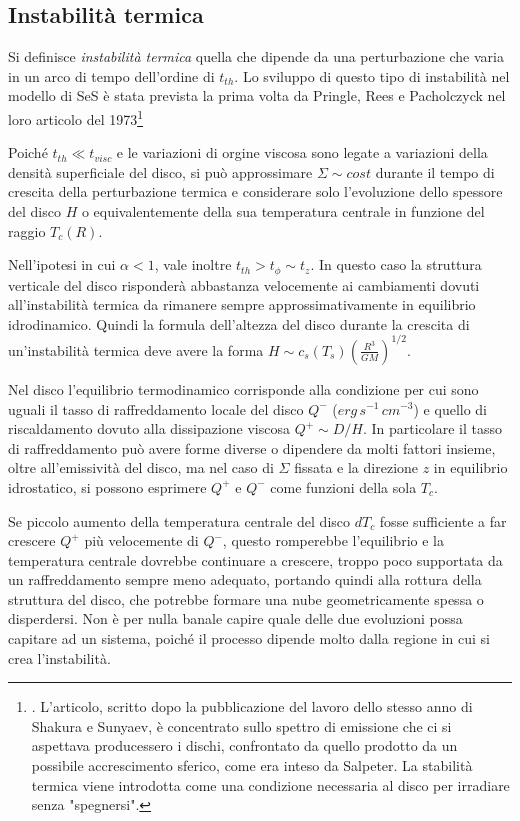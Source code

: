 \documentclass[a4paperbi]{article}
\begin{document}
\subsection{Instabilità termica}
	Si definisce \textit{instabilità termica} quella che dipende da una perturbazione che varia in un arco di tempo dell'ordine di $t_{th}$. Lo sviluppo di questo tipo di instabilità nel modello di SeS è stata prevista la prima volta da Pringle, Rees e Pacholczyck nel loro articolo del 1973\footnote{\cite{PringleReesPacholczyk1973}. L'articolo, scritto dopo la pubblicazione del lavoro dello stesso anno di Shakura e Sunyaev, è concentrato sullo spettro di emissione che ci si aspettava producessero i dischi, confrontato da quello prodotto da un possibile accrescimento sferico, come era inteso da Salpeter. La stabilità termica viene introdotta come una condizione necessaria al disco per irradiare senza "spegnersi".}

	Poiché $t_{th}\ll t_{visc}$ e le variazioni di orgine viscosa sono legate a variazioni della densità superficiale del disco, si può approssimare $\Sigma\sim cost$ durante il tempo di crescita della perturbazione termica e considerare solo l'evoluzione dello spessore del disco $H$ o equivalentemente della sua temperatura centrale in funzione del raggio $T_c(R)$.
	
	Nell'ipotesi in cui $\alpha<1$, vale inoltre $t_{th}>t_\phi\sim t_z$. In questo caso la struttura verticale del disco risponderà abbastanza velocemente ai cambiamenti dovuti all'instabilità termica da rimanere sempre approssimativamente in equilibrio idrodinamico. Quindi la formula dell'altezza del disco durante la crescita di un'instabilità termica deve avere la forma $H\sim c_s(T_s)\left(\frac{R^3}{GM}\right)^{1/2}$.
	
	Nel disco l'equilibrio termodinamico corrisponde alla condizione per cui sono uguali il tasso di raffreddamento locale del disco $Q^-$ ($erg\,s^{-1}\,cm^{-3}$) e quello di riscaldamento dovuto alla dissipazione viscosa $Q^+\sim D/H$. In particolare il tasso di raffreddamento può avere forme diverse o dipendere da molti fattori insieme, oltre all'emissività del disco, ma nel caso di $\Sigma$ fissata e la direzione $z$ in equilibrio idrostatico, si possono esprimere $Q^+$ e $Q^-$ come funzioni della sola $T_c$. 
	
	Se piccolo aumento della temperatura centrale del disco $dT_c$ fosse sufficiente a far crescere $Q^+$ più velocemente di $Q^-$, questo romperebbe l'equilibrio e la temperatura centrale dovrebbe continuare a crescere, troppo poco supportata da un raffreddamento sempre meno adequato, portando quindi alla rottura della struttura del disco, che potrebbe formare una nube geometricamente spessa o disperdersi. Non è per nulla banale capire quale delle due evoluzioni possa capitare ad un sistema, poiché il processo dipende molto dalla regione in cui si crea l'instabilità.
	
\end{document}
